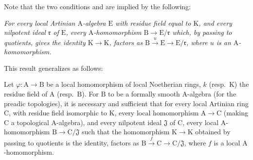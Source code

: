 \begin{remark}[22.1.3]
Note that the two conditions  and  are implied by the following:

\begin{env}[22.1.3.3]
\label{0.22.1.3.3}
\itshape For every local \textup{Artinian} $\mathrm{A}$-algebra $\mathrm{E}$ with residue field \textup{equal to} $\mathrm{K}$, and every nilpotent ideal $\mathfrak{r}$ of $\mathrm{E}$, every $\mathrm{A}$-homomorphism $\mathrm{B}\to\mathrm{E}/\mathfrak{r}$ which, by passing to quotients, gives the identity $\mathrm{K}\to\mathrm{K}$, factors as $\mathrm{B}\xrightarrow{u}\mathrm{E}\to\mathrm{E}/\mathfrak{r}$, where $u$ is an $\mathrm{A}$-homomorphism.
\end{env}
\end{remark}

This result generalizes as follows:

\begin{proposition}[22.1.4]
\label{0.22.1.4}
Let $\varphi:\mathrm{A}\to\mathrm{B}$ be a local homomorphism of local Noetherian rings, $k$ \textup{(resp.~$\mathrm{K}$)} the residue field of $\mathrm{A}$ \textup{(resp.~$\mathrm{B}$)}.
For $\mathrm{B}$ to be a formally smooth $\mathrm{A}$-algebra (for the preadic topologies), it is necessary and sufficient that for every local \textup{Artinian} ring $\mathrm{C}$, with residue field \textup{isomorphic to} $\mathrm{K}$, every local homomorphism $\mathrm{A}\to\mathrm{C}$ (making $\mathrm{C}$ a topological $\mathrm{A}$-algebra), and every nilpotent ideal $\mathfrak{J}$ of $\mathrm{C}$, every local $\mathrm{A}$-homomorphism $\mathrm{B}\to\mathrm{C}/\mathfrak{J}$ such that the homomorphism $\mathrm{K}\to\mathrm{K}$ obtained by passing to quotients is the identity, factors as $\mathrm{B}\xrightarrow{f}\mathrm{C}\to\mathrm{C}/\mathfrak{J}$, where $f$ is a local $\mathrm{A}$-homomorphism.
\end{proposition}

